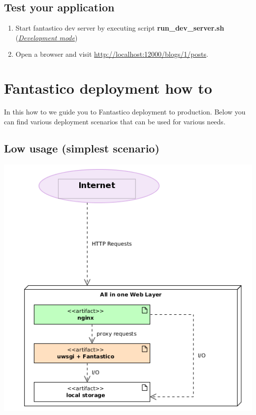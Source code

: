 \documentclass[letterpaper,10pt,english]{sphinxmanual}
\begin{document}
\subsection{Test your application}
\label{how_to/mvc_how_to:test-your-application}\begin{enumerate}
\item {} 
Start fantastico dev server by executing script \textbf{run\_dev\_server.sh} ({\hyperref[get_started/dev_mode::doc]{\emph{Development mode}}})

\item {} 
Open a browser and visit \href{http://localhost:12000/blogs/1/posts}{http://localhost:12000/blogs/1/posts}.

\end{enumerate}


\section{Fantastico deployment how to}
\label{how_to/deployment_how_to:fantastico-deployment-how-to}\label{how_to/deployment_how_to::doc}
In this how to we guide you to Fantastico deployment to production. Below you can find various deployment scenarios
that can be used for various needs.


\subsection{Low usage (simplest scenario)}
\label{how_to/deployment/low_usage_scenario::doc}\label{how_to/deployment/low_usage_scenario:low-usage-simplest-scenario}
\includegraphics{low_usage_all_in_one.png}
\end{document}
